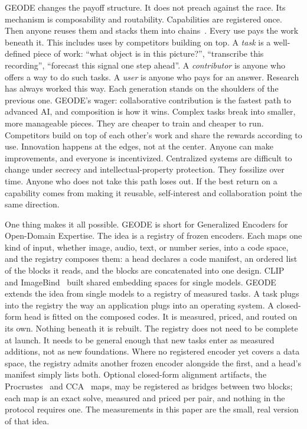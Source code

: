 \documentclass[11pt]{article}
\begin{document}
GEODE changes the payoff structure. It does not preach against the
race. Its mechanism is composability and routability. Capabilities
are registered once. Then anyone reuses them and stacks them into
chains~\cite{schick2023}. Every use pays the work beneath it.
This includes uses by competitors building on top. A \emph{task} is
a well-defined piece of work: ``what object is in this picture?'',
``transcribe this recording'', ``forecast this signal one step
ahead''. A \emph{contributor} is anyone who offers a way to do
such tasks. A \emph{user} is anyone who pays for an answer.
Research has always worked this way. Each generation stands on the
shoulders of the previous one. GEODE's wager: collaborative
contribution is the fastest path to advanced AI, and composition
is how it wins. Complex tasks break into smaller, more manageable
pieces. They are cheaper to train and cheaper to run. Competitors
build on top of each other's work and share the rewards according
to use. Innovation happens at the edges, not at the center. Anyone can
make improvements, and everyone is incentivized. Centralized
systems are difficult to change under secrecy and
intellectual-property protection. They fossilize over time.
Anyone who does not take this path loses out. If
the best return on a capability comes from making it reusable,
self-interest and collaboration point the same direction.

One thing makes it all possible. GEODE is short for Generalized
Encoders for Open-Domain Expertise.
The idea is a registry of frozen encoders. Each maps one kind of
input, whether image, audio, text, or number series, into a code space,
and the registry composes them: a head declares a code manifest, an
ordered list of the blocks it reads, and the blocks are
concatenated into one design. CLIP~\cite{clip2021} and
ImageBind~\cite{imagebind2023} built shared embedding spaces for
single models. GEODE extends the idea from single models to a
registry of measured tasks. A task plugs into the registry the way
an application plugs into an operating system. A closed-form head
is fitted on the composed codes. It is measured, priced, and routed
on its own. Nothing beneath it is rebuilt. The registry does not
need to be complete at launch. It needs to be general enough that
new tasks enter as measured additions, not as new foundations.
Where no registered encoder yet covers a data space, the registry
admits another frozen encoder alongside the first, and a head's
manifest simply lists both. Optional closed-form alignment
artifacts, the Procrustes~\cite{schoenemann1966} and
CCA~\cite{hotelling1936,hardoon2004} maps, may be registered as
bridges between two blocks; each map is an exact solve, measured
and priced per pair, and nothing in the protocol requires one.
The measurements in this paper are the small, real version of that
idea.
\end{document}
